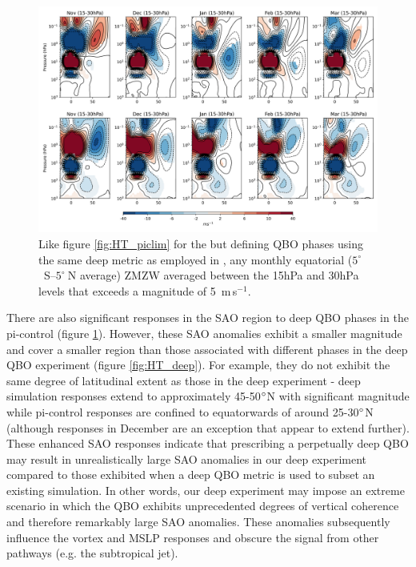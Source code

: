 \begin{figure}[h!]
\begin{center}
\noindent\includegraphics[width = \linewidth]{Figures/Figures-deepQBO/ZMZW_composites_by_month_QBO_phases_U_picontrol_MarQBO_vs_Mar_deep2hPa_5thresh.png}
\caption[ZMZW composites under different QBO phases in the pi-control simulation]{Like figure \ref{fig:HT_piclim} for the but defining QBO phases using the same deep metric as employed in \cite{andrewsObserved2019d}, any monthly equatorial ($5^{\circ}$\ S--$5^{\circ}\ $N average) ZMZW averaged between the 15hPa and 30hPa levels that exceeds a magnitude of 5\ m\,s$^{-1}$.}
\label{fig:HT_picontrol}
\end{center}
\end{figure}

There are also significant responses in the SAO region to deep QBO phases in the pi-control (figure \ref{fig:HT_picontrol}). However, these SAO anomalies exhibit a smaller magnitude and cover a smaller region than those associated with different phases in the deep QBO experiment (figure \ref{fig:HT_deep}). For example, they do not exhibit the same degree of latitudinal extent as those in the deep experiment - deep simulation responses extend to approximately 45-50$\degree$N with significant magnitude while pi-control responses are confined to equatorwards of around 25-30$\degree$N (although responses in December are an exception that appear to extend further). These enhanced SAO responses indicate that prescribing a perpetually deep QBO may result in unrealistically large SAO anomalies in our deep experiment compared to those exhibited when a deep QBO metric is used to subset an existing simulation. In other words, our deep experiment may impose an extreme scenario in which the QBO exhibits unprecedented degrees of vertical coherence and therefore remarkably large SAO anomalies. These anomalies subsequently influence the vortex and MSLP responses and obscure the signal from other pathways (e.g. the subtropical jet).

